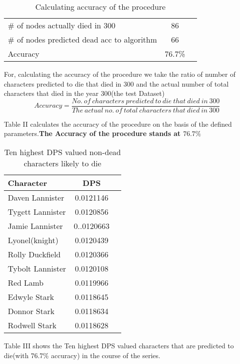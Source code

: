 \documentclass[conference]{IEEEtran}
\begin{document}
\begin{table}[h!]
  \begin{center}
    \caption{Calculating accuracy of the procedure}
    \label{tab:table2}
    \begin{tabular}{l|c|r} %
      \hline
      \# of nodes actually died in 300 & 86\\
      \# of nodes predicted dead acc to algorithm & 66\\
      Accuracy & 76.7\%\\
    \end{tabular}
  \end{center}
\end{table}

For, calculating the accuracy of the procedure we take the ratio of number of characters predicted to die that died in 300 and the actual number of total characters that died in the year 300(the test Dataset)
$$Accuracy = \frac{No.\ of\ characters\ predicted\ to\ die\ that\ died\ in\ 300}{The\  actual\ no.\ of\ total\ characters\ that\ died\ in\ 300}$$

Table II calculates the accuracy of the procedure on the basis of the defined parameters.\textbf{The Accuracy of the procedure stands at $76.7\%$
}

\begin{table}[h!]
  \begin{center}
    \caption{Ten highest DPS valued non-dead characters likely to die}
    \label{tab:table2}
    \begin{tabular}{l|c|r} %
      \textbf{Character} & \textbf{DPS}\\
      \hline
      Daven Lannister & 0.0121146\\
      Tygett Lannister & 0.0120856\\
      Jamie Lannister & 0..0120663\\
      Lyonel(knight) & 0.0120439\\
      Rolly Duckfield & 0.0120366\\
      Tybolt Lannister & 0.0120108\\
      Red Lamb & 0.0119966\\
      Edwyle Stark & 0.0118645\\
      Donnor Stark & 0.0118634\\
      Rodwell Stark & 0.0118628\\
    \end{tabular}
  \end{center}
\end{table}
Table III shows the Ten highest DPS valued characters that are predicted to die(with 76.7\% accuracy) in the course of the series.
\end{document}
